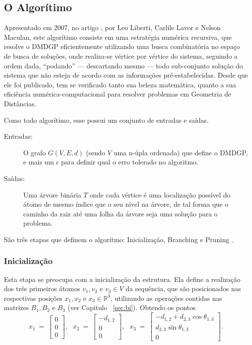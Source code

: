 \documentclass[a4paper,12pt]{article}
\begin{document}
	\subsection{O Algorítimo}
	Apresentado em 2007, no artigo \cite{carlile:BP}, por Leo Liberti, Carlile Lavor e Nelson Maculan, este algorítimo consiste em uma estratégia numérica recursiva, que resolve o DMDGP eficientemente utilizando uma busca combinatória no espaço de busca de soluções, onde realiza-se vértice por vértice do sistema, seguindo a ordem dada, ``podando'' --- descartando mesmo --- todo sub-conjunto solução do sistema que não esteja de acordo com as informações pré-estabelecidas. Desde que ele foi publicado, tem se verificado tanto sua beleza matemática, quanto a sua eficiência numérica-computacional para resolver problemas em Geometria de Distâncias.
	
	Como todo algorítimo, esse possui um conjunto de entradas e saídas.
	\begin{description}
		\item[Entradas:] O grafo $G(V, E, d)$ (sendo $V$ uma n-úpla ordenada) que define o DMDGP, e mais um $\epsilon$ para definir qual o erro tolerado no algoritmo.
		\item[Saídas:] Uma árvore binária $T$ onde cada vértice é uma localização possível do átomo de mesmo índice que o seu nível na árvore, de tal forma que o caminho da raiz até uma folha da árvore seja uma solução para o problema.
	\end{description}

	São três etapas que definem o algoritmo: Inicialização, Branching e Pruning \cite{fidalgotese}.
		
	\subsubsection*{Inicialização}
	Esta etapa se preocupa com a inicialização da estrutura. Ela define a realização dos três primeiros átomos $v_1, v_2$ e $v_3 \in V$ da sequência, que são posicionados nas respectivas posições $x_1, x_2$ e $x_3 \in \mathbb{R}^3$, utilizando as operações contidas nas matrizes $B_1, B_2$ e $B_3$ (ver Capitulo ~\ref{sec:bi}). Obtendo os pontos 	
	$$
	x_1\:=\:
	\begin{bmatrix}
	0\\ 
	0\\  
	0
	\end{bmatrix},\:\:\:
	x_2\:=\:
	\begin{bmatrix}
	-d_{1,2}\\ 
	0\\  
	0
	\end{bmatrix},\:\:\:
	x_3\:=\:
	\begin{bmatrix}
	-d_{1,2}+d_{2,3}\cos\theta_{1,3}\\ 
	d_{2,3}\sin\theta_{1,3}\\  
	0
	\end{bmatrix}.
	$$
	
\end{document}

